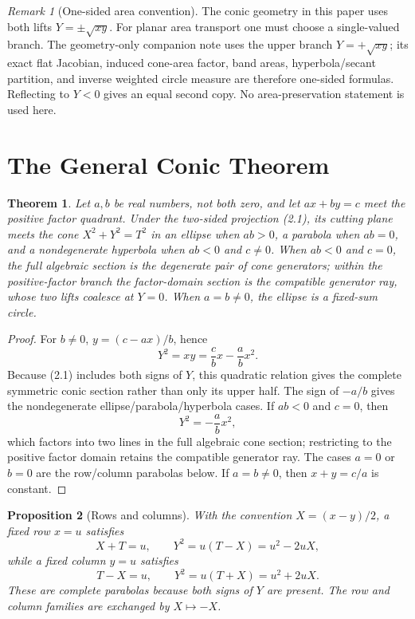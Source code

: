 \documentclass[11pt]{amsart}
\newtheorem{theorem}{Theorem}[section]
\newtheorem{proposition}[theorem]{Proposition}
\theoremstyle{remark}
\newtheorem*{remark}{Remark}
\begin{document}
\begin{remark}[One-sided area convention]
The conic geometry in this paper uses both lifts $Y=\pm\sqrt{xy}$. For planar area transport one must choose a single-valued branch. The geometry-only companion note \cite{Ebert2026Area} uses the upper branch $Y=+\sqrt{xy}$; its exact flat Jacobian, induced cone-area factor, band areas, hyperbola/secant partition, and inverse weighted circle measure are therefore one-sided formulas. Reflecting to $Y<0$ gives an equal second copy. No area-preservation statement is used here.
\end{remark}

\section{The General Conic Theorem}
\begin{theorem}\label{thm:conic}
Let $a,b$ be real numbers, not both zero, and let $ax+by=c$ meet the positive factor quadrant. Under the two-sided projection (2.1), its cutting plane meets the cone $X^2+Y^2=T^2$ in an ellipse when $ab>0$, a parabola when $ab=0$, and a nondegenerate hyperbola when $ab<0$ and $c\ne0$. When $ab<0$ and $c=0$, the full algebraic section is the degenerate pair of cone generators; within the positive-factor branch the factor-domain section is the compatible generator ray, whose two lifts coalesce at $Y=0$. When $a=b\ne0$, the ellipse is a fixed-sum circle.
\end{theorem}
\begin{proof}
For $b\ne0$, $y=(c-ax)/b$, hence
\[
Y^2=xy=\frac cbx-\frac abx^2.
\]
Because (2.1) includes both signs of $Y$, this quadratic relation gives the complete symmetric conic section rather than only its upper half. The sign of $-a/b$ gives the nondegenerate ellipse/parabola/hyperbola cases. If $ab<0$ and $c=0$, then
\[
Y^2=-\frac ab x^2,
\]
which factors into two lines in the full algebraic cone section; restricting to the positive factor domain retains the compatible generator ray. The cases $a=0$ or $b=0$ are the row/column parabolas below. If $a=b\ne0$, then $x+y=c/a$ is constant.
\end{proof}

\begin{proposition}[Rows and columns]\label{prop:rows}
With the convention $X=(x-y)/2$, a fixed row $x=u$ satisfies
\[
X+T=u,\qquad Y^2=u(T-X)=u^2-2uX,
\]
while a fixed column $y=u$ satisfies
\[
T-X=u,\qquad Y^2=u(T+X)=u^2+2uX.
\]
These are complete parabolas because both signs of $Y$ are present. The row and column families are exchanged by $X\mapsto-X$.
\end{proposition}
\end{document}
